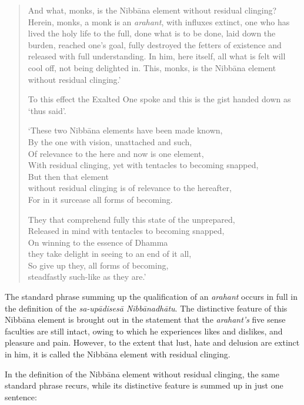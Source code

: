\begin{quote}
And what, monks, is the Nibbāna element without residual clinging? Herein, monks, a monk is an \emph{arahant}, with influxes extinct, one who has lived the holy life to the full, done what is to be done, laid down the burden, reached one's goal, fully destroyed the fetters of existence and released with full understanding. In him, here itself, all what is felt will cool off, not being delighted in. This, monks, is the Nibbāna element without residual clinging.'

To this effect the Exalted One spoke and this is the gist handed down as `thus said'.

`These two Nibbāna elements have been made known,\\
By the one with vision, unattached and such,\\
Of relevance to the here and now is one element,\\
With residual clinging, yet with tentacles to becoming snapped,\\
But then that element\\
\vin without residual clinging is of relevance to the hereafter,\\
For in it surcease all forms of becoming.

They that comprehend fully this state of the unprepared,\\
Released in mind with tentacles to becoming snapped,\\
On winning to the essence of Dhamma\\
\vin they take delight in seeing to an end of it all,\\
So give up they, all forms of becoming,\\
\vin steadfastly such-like as they are.'
\end{quote}

The standard phrase summing up the qualification of an \emph{arahant} occurs in full in the definition of the \emph{sa-upādisesā Nibbānadhātu}. The distinctive feature of this Nibbāna element is brought out in the statement that the \emph{arahant's} five sense faculties are still intact, owing to which he experiences likes and dislikes, and pleasure and pain. However, to the extent that lust, hate and delusion are extinct in him, it is called the Nibbāna element with residual clinging.

In the definition of the Nibbāna element without residual clinging, the same standard phrase recurs, while its distinctive feature is summed up in just one sentence:

\clearpage

